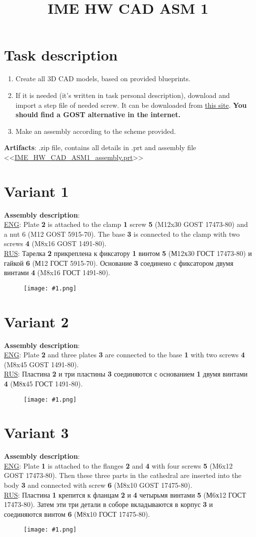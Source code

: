 \documentclass{article}
\title{IME HW CAD ASM 1} %
\author{} %
\date{}
\newcommand\ttask[3] 
 {
	\section*{Variant #1}
	\textbf{Assembly description}: \\
	\underline{ENG}: #2 \smallskip \\ 
	\underline{RUS}: #3
	\begin{figure}[H]
		\centering\texttt{[image: \#1.png]}
		\label{fig:#1.png}
	\end{figure}
	\newpage
 }
\begin{document}
	\maketitle %
    
	\section{Task description}
	\begin{enumerate}
		\item Create all 3D CAD models, based on provided blueprints.
		\item If it is needed (it's written in task personal description), download and import a step file of needed screw. It can be downloaded from \href{https://www.mcmaster.com/}{this site}. \textbf{You should find a GOST alternative in the internet.} 
		\item Make an assembly according to the scheme provided.
	\end{enumerate}
	\textbf{Artifacts}: .zip file, contains all details in .prt and assembly file <<\url{IME_HW_CAD_ASM1_assembly.prt}>>

	\newpage
	\ttask{1}{Plate \textbf{2} is attached to the clamp \textbf{1} screw \textbf{5} (M12x30 GOST 17473-80) and a nut 6 (M12 GOST 5915-70). The base \textbf{3} is connected to the clamp with two screws \textbf{4} (M8x16 GOST 1491-80).}{Тарелка \textbf{2} прикреплена к фиксатору \textbf{1} винтом \textbf{5} (М12х30 ГОСТ 17473-80) и гайкой \textbf{6} (М12 ГОСТ 5915-70). Основание \textbf{3} соединено с фиксатором двумя винтами \textbf{4} (M8x16 ГОСТ 1491-80).}
	
	\ttask{2}{Plate \textbf{2} and three plates \textbf{3} are connected to the base \textbf{1} with two screws \textbf{4} (M8x45 GOST 1491-80).}{Пластина \textbf{2} и три пластины \textbf{3} соединяются с основанием \textbf{1} двумя винтами \textbf{4} (М8х45 ГОСТ 1491-80).}

	\ttask{3}{Plate \textbf{1} is attached to the flanges \textbf{2} and \textbf{4} with four screws \textbf{5} (M6x12 GOST 17473-80). Then these three parts in the cathedral are inserted into the body \textbf{3} and connected with screw \textbf{6} (M8x10 GOST 17475-80).}{Пластина \textbf{1} крепится к фланцам \textbf{2} и \textbf{4} четырьмя винтами \textbf{5} (М6х12 ГОСТ 17473-80). Затем эти три детали в соборе вкладываются в корпус \textbf{3} и соединяются винтом \textbf{6} (М8х10 ГОСТ 17475-80).}
\end{document}

